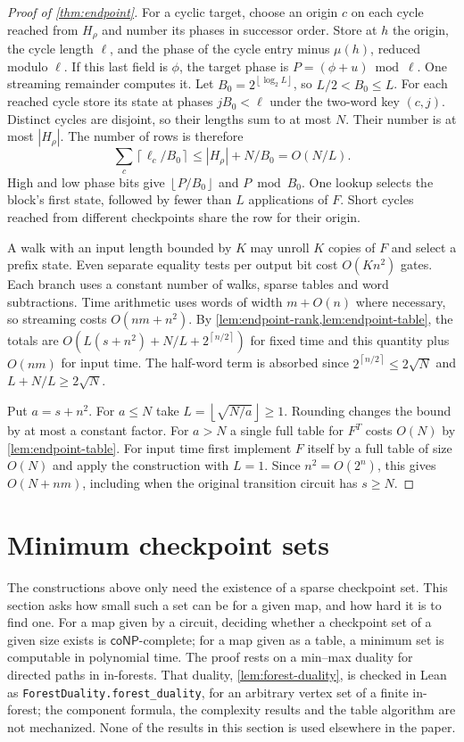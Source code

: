 \documentclass[11pt]{article}
\theoremstyle{definition}
\theoremstyle{remark}
\newcommand{\floor}[1]{\left\lfloor #1\right\rfloor}
\newcommand{\ceil}[1]{\left\lceil #1\right\rceil}
\numberwithin{equation}{section}
\begin{document}
\begin{proof}[Proof of \cref{thm:endpoint}]
For a cyclic target, choose an origin $c$ on each cycle reached from
$H_\rho$ and number its phases in successor order. Store at $h$ the
origin, the cycle length $\ell$, and the phase of the cycle entry minus
$\mu(h)$, reduced modulo $\ell$. If this last field is $\phi$, the
target phase is $P=(\phi+u)\bmod\ell$. One streaming remainder computes
it. Let $B_0=2^{\floor{\log_2 L}}$, so $L/2<B_0\le L$. For each
reached cycle store its state at phases $jB_0<\ell$ under the two-word
key $(c,j)$. Distinct cycles are disjoint, so their lengths sum to at
most $N$. Their number is at most $|H_\rho|$. The number of rows is
therefore
\[
 \sum_c\ceil{\ell_c/B_0}\le |H_\rho|+N/B_0=O(N/L).
\]
High and low phase bits give $\floor{P/B_0}$ and $P\bmod B_0$.
One lookup selects the block's first state, followed by fewer than $L$
applications of $F$. Short cycles reached from different checkpoints
share the row for their origin.

A walk with an input length bounded by $K$ may unroll $K$ copies of
$F$ and select a prefix state. Even separate equality tests per output
bit cost $O(Kn^2)$ gates. Each branch uses a constant number of walks,
sparse tables and word subtractions. Time arithmetic uses words of
width $m+O(n)$ where necessary, so streaming costs $O(nm+n^2)$.
By \cref{lem:endpoint-rank,lem:endpoint-table}, the totals are
$O(L(s+n^2)+N/L+2^{\ceil{n/2}})$ for fixed time and this quantity
plus $O(nm)$ for input time. The half-word term is absorbed since
$2^{\ceil{n/2}}\le2\sqrt N$ and $L+N/L\ge2\sqrt N$.

Put $a=s+n^2$. For $a\le N$ take $L=\floor{\sqrt{N/a}}\ge1$.
Rounding changes the bound by at most a constant factor. For $a>N$
a single full table for $F^T$ costs $O(N)$ by
\cref{lem:endpoint-table}. For input time first implement $F$ itself
by a full table of size $O(N)$ and apply the construction with $L=1$.
Since $n^2=O(2^n)$, this gives $O(N+nm)$, including when the
original transition circuit has $s\ge N$.
\end{proof}

\section{Minimum checkpoint sets}\label{sec:min-checkpoints}

The constructions above only need the existence of a sparse checkpoint
set.  This section asks how small such a set can be for a given map, and
how hard it is to find one.  For a map given by a circuit, deciding
whether a checkpoint set of a given size exists is
$\mathsf{coNP}$-complete; for a map given as a table, a minimum set is
computable in polynomial time.  The proof rests on a min--max duality for
directed paths in in-forests.  That duality, \cref{lem:forest-duality},
is checked in Lean as \texttt{ForestDuality.forest\_duality}, for an
arbitrary vertex set of a finite in-forest; the component formula, the
complexity results and the table algorithm are not mechanized.  None of
the results in this section is used elsewhere in the paper.
\end{document}
